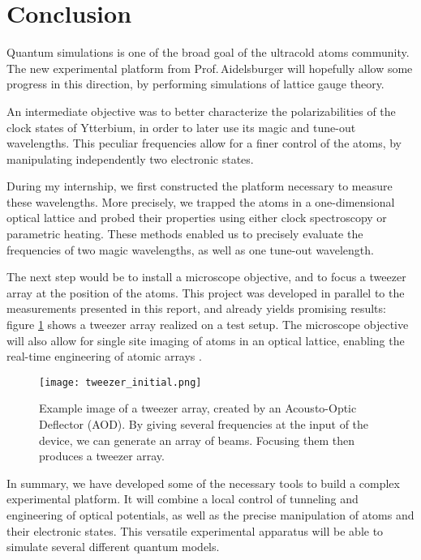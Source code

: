 \documentclass[11pt]{article}
\numberwithin{equation}{section}
\numberwithin{figure}{section}
\begin{document}

\section{Conclusion}
\label{sec:conclusion}

Quantum simulations is one of the broad goal of the ultracold atoms community. The new experimental platform from Prof.$\,$Aidelsburger will hopefully allow some progress in this direction, by performing simulations of lattice gauge theory. 

An intermediate objective was to better characterize the polarizabilities of the clock states of Ytterbium, in order to later use its magic and tune-out wavelengths. This peculiar frequencies allow for a finer control of the atoms, by manipulating independently two electronic states.

During my internship, we first constructed the platform necessary to measure these wavelengths. More precisely, we trapped the atoms in a one-dimensional optical lattice and probed their properties using either clock spectroscopy or parametric heating. These methods enabled us to precisely evaluate the frequencies of two magic wavelengths, as well as one tune-out wavelength.

The next step would be to install a microscope objective, and to focus a tweezer array at the position of the atoms. This project was developed in parallel to the measurements presented in this report, and already yields promising results: figure \ref{fig:tweezers} shows a tweezer array realized on a test setup. The microscope objective will also allow for single site imaging of atoms in an optical lattice, enabling the real-time engineering of atomic arrays \citep{2016_barredo, 2016_endres}.

%
\begin{figure}[htb]
	\centering
   \texttt{[image: tweezer\_initial.png]}
	\caption{\small Example image of a tweezer array, created by an Acousto-Optic Deflector (AOD). By giving several frequencies at the input of the device, we can generate an array of beams. Focusing them then produces a tweezer array.}
   \label{fig:tweezers}
\end{figure}
%

In summary, we have developed some of the necessary tools to build a complex experimental platform. It will combine a local control of tunneling and engineering of optical potentials, as well as the precise manipulation of atoms and their electronic states. This versatile experimental apparatus will be able to simulate several different quantum models.
\end{document}
